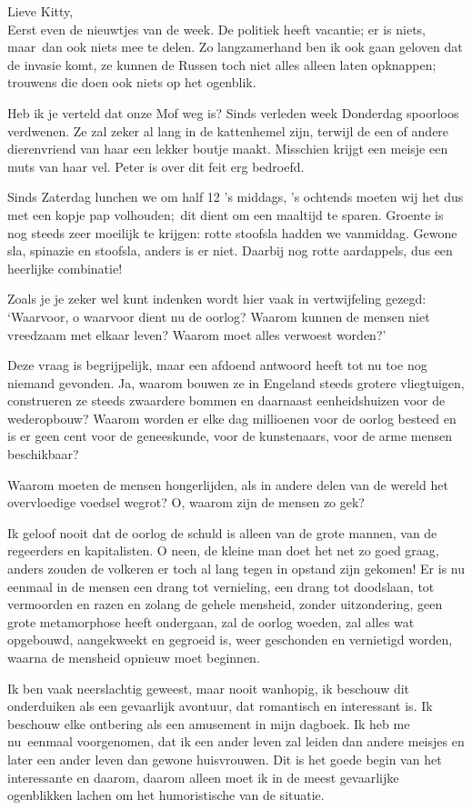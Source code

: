 \documentclass{book}
\begin{document}
Lieve Kitty,\\Eerst even de nieuwtjes van de week. De politiek heeft
vacantie; er is niets, maar~dan ook niets mee te delen. Zo langzamerhand
ben ik ook gaan geloven dat de invasie komt, ze kunnen de Russen toch
niet alles alleen laten opknappen; trouwens die doen ook niets op het
ogenblik.

Heb ik je verteld dat onze Mof weg is? Sinds verleden week Donderdag
spoorloos verdwenen. Ze zal zeker al lang in de kattenhemel zijn,
terwijl de een of andere dierenvriend van haar een lekker boutje maakt.
Misschien krijgt een meisje een muts van haar vel. Peter is over dit
feit erg bedroefd.

Sinds Zaterdag lunchen we om half 12 's middags, 's ochtends moeten wij
het dus met een kopje pap volhouden;~dit dient om een maaltijd te
sparen. Groente is nog steeds zeer moeilijk te krijgen: rotte stoofsla
hadden we vanmiddag. Gewone sla, spinazie en stoofsla, anders is er
niet. Daarbij nog rotte aardappels, dus een heerlijke combinatie!

Zoals je je zeker wel kunt indenken wordt hier vaak in vertwijfeling
gezegd: `Waarvoor, o waarvoor dient nu de oorlog? Waarom kunnen de
mensen niet vreedzaam met elkaar leven? Waarom moet alles verwoest
worden?'

Deze vraag is begrijpelijk, maar een afdoend antwoord heeft tot nu toe
nog niemand gevonden. Ja, waarom bouwen ze in Engeland steeds grotere
vliegtuigen, construeren ze steeds zwaardere bommen en daarnaast
eenheidshuizen voor de wederopbouw? Waarom worden er elke dag millioenen
voor de oorlog besteed en is er geen cent voor de geneeskunde, voor de
kunstenaars, voor de arme mensen beschikbaar?

Waarom moeten de mensen hongerlijden, als in andere delen van de wereld
het overvloedige voedsel wegrot? O, waarom zijn de mensen zo gek?

Ik geloof nooit dat de oorlog de schuld is alleen van de grote mannen,
van de regeerders en kapitalisten. O neen, de kleine man doet het net zo
goed graag, anders zouden de volkeren er toch al lang tegen in opstand
zijn gekomen! Er is nu eenmaal in de mensen een drang tot vernieling,
een drang tot doodslaan, tot vermoorden en razen en zolang de gehele
mensheid, zonder uitzondering, geen grote metamorphose heeft ondergaan,
zal de oorlog woeden, zal alles wat opgebouwd, aangekweekt en gegroeid
is, weer geschonden en vernietigd worden, waarna de mensheid opnieuw
moet beginnen.

Ik ben vaak neerslachtig geweest, maar nooit wanhopig, ik beschouw dit
onderduiken als een gevaarlijk avontuur, dat romantisch en interessant
is. Ik beschouw elke ontbering als een amusement in mijn dagboek. Ik heb
me nu~eenmaal voorgenomen, dat ik een ander leven zal leiden dan andere
meisjes en later een ander leven dan gewone huisvrouwen. Dit is het
goede begin van het interessante en daarom, daarom alleen moet ik in de
meest gevaarlijke ogenblikken lachen om het humoristische van de
situatie.
\end{document}
